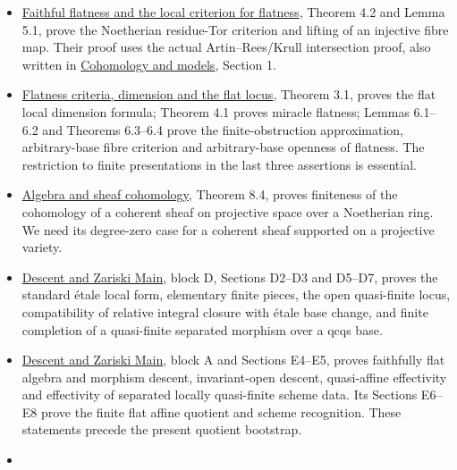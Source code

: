 \documentclass[11pt,a4paper,openany]{report}
\begin{document}
\begin{itemize}
\item
  \href{https://github.com/KokunoYumeto/open-math-courses/blob/d02d0a3669f42579db037cd44de1d113fdd770a1/docs/courses/AG-CA/src/faithful-flatness-and-the-local-criterion-for-flatness.md}{Faithful flatness and the local criterion for flatness}, Theorem 4.2 and Lemma 5.1, prove the Noetherian residue-Tor criterion and lifting of an injective fibre map. Their proof uses the actual Artin--Rees/Krull intersection proof, also written in \href{https://github.com/KokunoYumeto/open-math-courses/blob/main/docs/courses/AG-RG/AG-RG-S02.md}{Cohomology and models}, Section 1.
\item
  \href{https://github.com/KokunoYumeto/open-math-courses/blob/d02d0a3669f42579db037cd44de1d113fdd770a1/docs/courses/AG-FSE/src/flatness-criteria.md}{Flatness criteria, dimension and the flat locus}, Theorem 3.1, proves the flat local dimension formula; Theorem 4.1 proves miracle flatness; Lemmas 6.1--6.2 and Theorems 6.3--6.4 prove the finite-obstruction approximation, arbitrary-base fibre criterion and arbitrary-base openness of flatness. The restriction to finite presentations in the last three assertions is essential.
\item
  \href{https://github.com/KokunoYumeto/open-math-courses/blob/main/docs/courses/AG-RG/AG-RG-S01.md}{Algebra and sheaf cohomology}, Theorem 8.4, proves finiteness of the cohomology of a coherent sheaf on projective space over a Noetherian ring. We need its degree-zero case for a coherent sheaf supported on a projective variety.
\item
  \href{https://github.com/KokunoYumeto/open-math-courses/blob/main/docs/courses/AG-RG/AG-RG-S04.md}{Descent and Zariski Main}, block D, Sections D2--D3 and D5--D7, proves the standard étale local form, elementary finite pieces, the open quasi-finite locus, compatibility of relative integral closure with étale base change, and finite completion of a quasi-finite separated morphism over a qcqs base.
\item
  \href{https://github.com/KokunoYumeto/open-math-courses/blob/main/docs/courses/AG-RG/AG-RG-S04.md}{Descent and Zariski Main}, block A and Sections E4--E5, proves faithfully flat algebra and morphism descent, invariant-open descent, quasi-affine effectivity and effectivity of separated locally quasi-finite scheme data. Its Sections E6--E8 prove the finite flat affine quotient and scheme recognition. These statements precede the present quotient bootstrap.
\item

\end{itemize}
\end{document}
